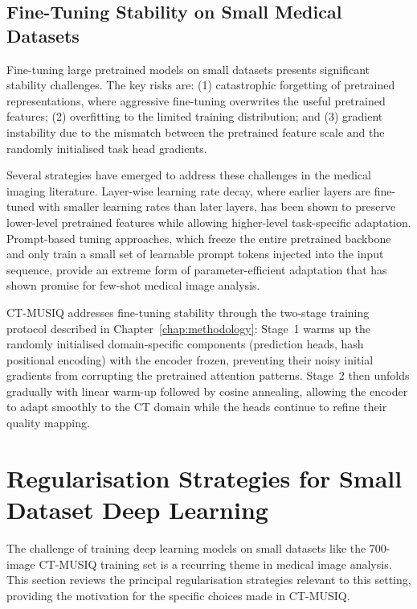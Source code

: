 \subsection{Fine-Tuning Stability on Small Medical Datasets}

Fine-tuning large pretrained models on small datasets presents significant stability
challenges. The key risks are: (1) catastrophic forgetting of pretrained representations,
where aggressive fine-tuning overwrites the useful pretrained features; (2) overfitting
to the limited training distribution; and (3) gradient instability due to the mismatch
between the pretrained feature scale and the randomly initialised task head gradients.

Several strategies have emerged to address these challenges in the medical imaging
literature. Layer-wise learning rate decay, where earlier layers are fine-tuned with
smaller learning rates than later layers, has been shown to preserve lower-level
pretrained features while allowing higher-level task-specific adaptation. Prompt-based
tuning approaches, which freeze the entire pretrained backbone and only train a small
set of learnable prompt tokens injected into the input sequence, provide an extreme
form of parameter-efficient adaptation that has shown promise for few-shot medical image
analysis.

CT-MUSIQ addresses fine-tuning stability through the two-stage training protocol described
in Chapter~\ref{chap:methodology}: Stage~1 warms up the randomly initialised
domain-specific components (prediction heads, hash positional encoding) with the encoder
frozen, preventing their noisy initial gradients from corrupting the pretrained attention
patterns. Stage~2 then unfolds gradually with linear warm-up followed by cosine
annealing, allowing the encoder to adapt smoothly to the CT domain while the heads
continue to refine their quality mapping.


\section{Regularisation Strategies for Small Dataset Deep Learning}
\label{sec:lit_regularisation}

The challenge of training deep learning models on small datasets like the 700-image
CT-MUSIQ training set is a recurring theme in medical image analysis. This section
reviews the principal regularisation strategies relevant to this setting, providing
the motivation for the specific choices made in CT-MUSIQ.

